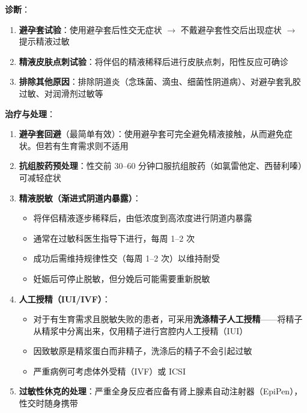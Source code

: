 \begin{enumerate}
\vspace{0.5em}
\noindent\textbf{诊断}：
\begin{enumerate}
	\item \textbf{避孕套试验}：使用避孕套后性交无症状 $\rightarrow$ 不戴避孕套性交后出现症状 $\rightarrow$ 提示精液过敏
	\item \textbf{精液皮肤点刺试验}：将伴侣的精液稀释后进行皮肤点刺，阳性反应可确诊
	\item \textbf{排除其他原因}：排除阴道炎（念珠菌、滴虫、细菌性阴道病）、对避孕套乳胶过敏、对润滑剂过敏等
\end{enumerate}

\vspace{0.5em}
\noindent\textbf{治疗与处理}：

\begin{enumerate}
	\item \textbf{避孕套回避}（最简单有效）：使用避孕套可完全避免精液接触，从而避免症状。但若有生育需求则不适用

	\item \textbf{抗组胺药预处理}：性交前 30--60 分钟口服抗组胺药（如氯雷他定、西替利嗪）可减轻症状

	\item \textbf{精液脱敏（渐进式阴道内暴露）}：
	\begin{itemize}
		\item 将伴侣精液逐步稀释后，由低浓度到高浓度进行阴道内暴露
		\item 通常在过敏科医生指导下进行，每周 1--2 次
		\item 成功后需维持规律性交（每周 1--2 次）以维持耐受
		\item 妊娠后可停止脱敏，但分娩后可能需要重新脱敏
	\end{itemize}

	\item \textbf{人工授精（IUI/IVF）}：
	\begin{itemize}
		\item 对于有生育需求且脱敏失败的患者，可采用\textbf{洗涤精子人工授精}——将精子从精浆中分离出来，仅用精子进行宫腔内人工授精（IUI）
		\item 因致敏原是精浆蛋白而非精子，洗涤后的精子不会引起过敏
		\item 严重病例可考虑体外受精（IVF）或 ICSI
	\end{itemize}

	\item \textbf{过敏性休克的处理}：严重全身反应者应备有肾上腺素自动注射器（EpiPen），性交时随身携带
\end{enumerate}


\end{enumerate}
